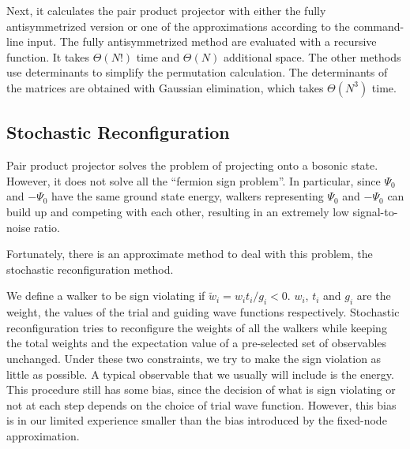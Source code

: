 \documentclass[aps,prl,reprint,groupedaddress]{revtex4-1}
\begin{document}
Next, it calculates the pair product projector with either the fully antisymmetrized version or one of the approximations according to the command-line input.
The fully antisymmetrized method are evaluated with a recursive function.
It takes $\Theta(N!)$ time and $\Theta(N)$ additional space.
The other methods use determinants to simplify the permutation calculation.
The determinants of the matrices are obtained with Gaussian elimination, which takes $\Theta(N^3)$ time.

\subsection{Stochastic Reconfiguration}

Pair product projector solves the problem of projecting onto a bosonic state.
However, it does not solve all the ``fermion sign problem''.
In particular, since $\Psi_0$ and $-\Psi_0$ have the same ground state energy, walkers representing $\Psi_0$ and $-\Psi_0$ can build up and competing with each other, resulting in an extremely low signal-to-noise ratio.

Fortunately, there is an approximate method to deal with this problem, the stochastic reconfiguration method.

We define a walker to be sign violating if $\widetilde{w}_i = w_it_i/g_i < 0$.
$w_i$, $t_i$ and $g_i$ are the weight, the values of the trial and guiding wave functions respectively.
Stochastic reconfiguration tries to reconfigure the weights of all the walkers while keeping the total weights and the expectation value of a pre-selected set of observables unchanged.
Under these two constraints, we try to make the sign violation as little as possible.
A typical observable that we usually will include is the energy.
This procedure still has some bias, since the decision of what is sign violating or not at each step depends on the choice of trial wave function.
However, this bias is in our limited experience smaller than the bias introduced by the fixed-node approximation.


%
\end{document}
